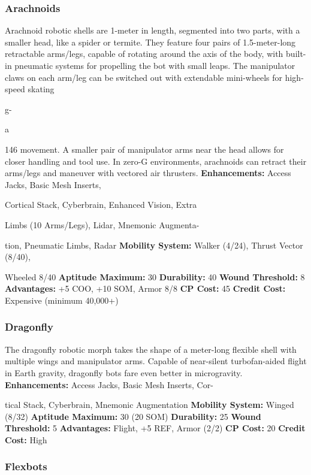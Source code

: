\subsubsection{Arachnoids}

Arachnoid robotic shells are 1-meter in length, segmented
into two parts, with a smaller head, like a
spider or termite. They feature four pairs of 1.5-meter-long
retractable arms/legs, capable of rotating around
the axis of the body, with built-in pneumatic systems 
for propelling the bot with small leaps. The manipulator
claws on each arm/leg can be switched out
with extendable mini-wheels for high-speed skating 

g-

a


146
movement. A smaller pair of manipulator arms near 
the head allows for closer handling and tool use. In 
zero-G environments, arachnoids can retract their 
arms/legs and maneuver with vectored air thrusters.
\textbf{Enhancements:} Access Jacks, Basic Mesh Inserts, 

Cortical Stack, Cyberbrain, Enhanced Vision, Extra 

Limbs (10 Arms/Legs), Lidar, Mnemonic Augmenta-

tion, Pneumatic Limbs, Radar
\textbf{Mobility System:} Walker (4/24), Thrust Vector (8/40), 

Wheeled 8/40
\textbf{Aptitude Maximum: }30
\textbf{Durability: }40
\textbf{Wound Threshold: }8
\textbf{Advantages:} +5 COO, +10 SOM, Armor 8/8
\textbf{CP Cost: }45
\textbf{Credit Cost: }Expensive (minimum 40,000+)

\subsubsection{Dragonfly}

The dragonfly robotic morph takes the shape of a 
meter-long flexible shell with multiple wings and manipulator
arms. Capable of near-silent turbofan-aided
flight in Earth gravity, dragonfly bots fare even better 
in microgravity.
\textbf{Enhancements:} Access Jacks, Basic Mesh Inserts, Cor-

tical Stack, Cyberbrain, Mnemonic Augmentation
\textbf{Mobility System:} Winged (8/32)
\textbf{Aptitude Maximum: }30 (20 SOM)
\textbf{Durability: }25
\textbf{Wound Threshold:} 5
\textbf{Advantages:} Flight, +5 REF, Armor (2/2)
\textbf{CP Cost: }20
\textbf{Credit Cost: }High

\subsubsection{Flexbots}

